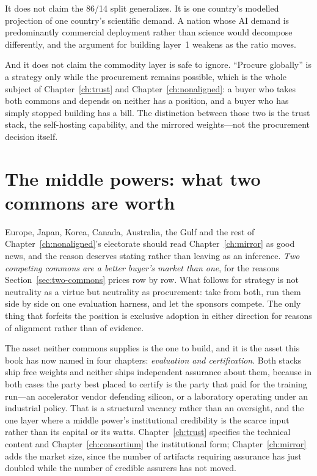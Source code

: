 It does not claim the 86/14 split generalizes. It is one country's modelled projection of one country's scientific demand. A nation whose AI demand is predominantly commercial deployment rather than science would decompose differently, and the argument for building layer~1 weakens as the ratio moves.

And it does not claim the commodity layer is safe to ignore. ``Procure globally'' is a strategy only while the procurement remains possible, which is the whole subject of Chapter~\ref{ch:trust} and Chapter~\ref{ch:nonaligned}: a buyer who takes both commons and depends on neither has a position, and a buyer who has simply stopped building has a bill. The distinction between those two is the trust stack, the self-hosting capability, and the mirrored weights---not the procurement decision itself.

\section{The middle powers: what two commons are worth}
\label{sec:middle-powers}

Europe, Japan, Korea, Canada, Australia, the Gulf and the rest of Chapter~\ref{ch:nonaligned}'s electorate should read Chapter~\ref{ch:mirror} as good news, and the reason deserves stating rather than leaving as an inference. \emph{Two competing commons are a better buyer's market than one}, for the reasons Section~\ref{sec:two-commons} prices row by row. What follows for strategy is not neutrality as a virtue but neutrality as procurement: take from both, run them side by side on one evaluation harness, and let the sponsors compete. The only thing that forfeits the position is exclusive adoption in either direction for reasons of alignment rather than of evidence.

The asset neither commons supplies is the one to build, and it is the asset this book has now named in four chapters: \emph{evaluation and certification}. Both stacks ship free weights and neither ships independent assurance about them, because in both cases the party best placed to certify is the party that paid for the training run---an accelerator vendor defending silicon, or a laboratory operating under an industrial policy. That is a structural vacancy rather than an oversight, and the one layer where a middle power's institutional credibility is the scarce input rather than its capital or its watts. Chapter~\ref{ch:trust} specifies the technical content and Chapter~\ref{ch:consortium} the institutional form; Chapter~\ref{ch:mirror} adds the market size, since the number of artifacts requiring assurance has just doubled while the number of credible assurers has not moved.

